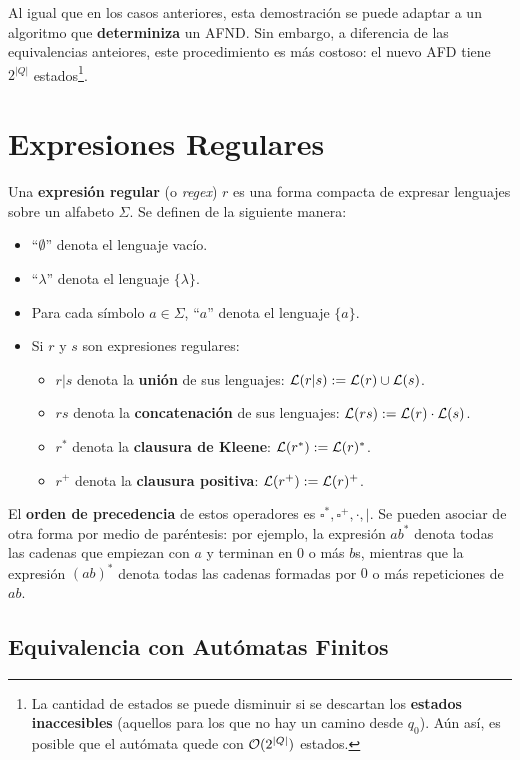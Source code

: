 Al igual que en los casos anteriores, esta demostración se puede adaptar a un algoritmo que \textbf{determiniza} un AFND. Sin embargo, a diferencia de las equivalencias anteiores, este procedimiento es más costoso: el nuevo AFD tiene $2^{|Q|}$ estados\footnote{La cantidad de estados se puede disminuir si se descartan los \textbf{estados inaccesibles} (aquellos para los que no hay un camino desde $q_0$). Aún así, es posible que el autómata quede con $\mathcal{O}(2^{|Q|})$ estados.}.

\section{Expresiones Regulares}

Una \textbf{expresión regular} (o \textit{regex}) $r$ es una forma compacta de expresar lenguajes sobre un alfabeto $\Sigma$. Se definen de la siguiente manera:
\begin{itemize}
    \item ``$\emptyset$'' denota el lenguaje vacío.
    \item ``$\lambda$'' denota el lenguaje $\{\lambda\}$.
    \item Para cada símbolo $a \in \Sigma$, ``$a$'' denota el lenguaje $\{a\}$.
    \item Si $r$ y $s$ son expresiones regulares:
          \begin{itemize}
              \item $r|s$ denota la \textbf{unión} de sus lenguajes: $\mathcal{L}(r|s) := \mathcal{L}(r) \cup \mathcal{L}(s)$.
              \item $rs$ denota la \textbf{concatenación} de sus lenguajes: $\mathcal{L}(rs) := \mathcal{L}(r) \cdot \mathcal{L}(s)$.
              \item $r^*$ denota la \textbf{clausura de Kleene}: $\mathcal{L}(r^*) := \mathcal{L}(r)^*$.
              \item $r^+$ denota la \textbf{clausura positiva}: $\mathcal{L}(r^+) := \mathcal{L}(r)^+$.
          \end{itemize}
\end{itemize}

El \textbf{orden de precedencia} de estos operadores es $\square^*, \square^+, \cdot, |$. Se pueden asociar de otra forma por medio de paréntesis: por ejemplo, la expresión $ab^*$ denota todas las cadenas que empiezan con $a$ y terminan en 0 o más $b$s, mientras que la expresión $(ab)^*$ denota todas las cadenas formadas por $0$ o más repeticiones de $ab$.

\subsection{Equivalencia con Autómatas Finitos}

